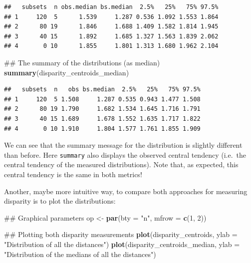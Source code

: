 \documentclass[]{book}
\newenvironment{Shaded}{\begin{snugshade}}{\end{snugshade}}
\newcommand{\KeywordTok}[1]{\textcolor[rgb]{0.13,0.29,0.53}{\textbf{#1}}}
\newcommand{\DataTypeTok}[1]{\textcolor[rgb]{0.13,0.29,0.53}{#1}}
\newcommand{\DecValTok}[1]{\textcolor[rgb]{0.00,0.00,0.81}{#1}}
\newcommand{\StringTok}[1]{\textcolor[rgb]{0.31,0.60,0.02}{#1}}
\newcommand{\NormalTok}[1]{#1}
\theoremstyle{definition}
\theoremstyle{definition}
\theoremstyle{remark}
\begin{document}
\begin{verbatim}
##   subsets  n obs.median bs.median  2.5%   25%   75% 97.5%
## 1     120  5      1.539     1.287 0.536 1.092 1.553 1.864
## 2      80 19      1.846     1.688 1.409 1.582 1.814 1.945
## 3      40 15      1.892     1.685 1.327 1.563 1.839 2.062
## 4       0 10      1.855     1.801 1.313 1.680 1.962 2.104
\end{verbatim}

\begin{Shaded}
\begin{Highlighting}[]
\NormalTok{## The summary of the distributions (as median)}
\KeywordTok{summary}\NormalTok{(disparity_centroids_median)}
\end{Highlighting}
\end{Shaded}

\begin{verbatim}
##   subsets  n   obs bs.median  2.5%   25%   75% 97.5%
## 1     120  5 1.508     1.287 0.535 0.943 1.477 1.508
## 2      80 19 1.790     1.682 1.534 1.645 1.716 1.791
## 3      40 15 1.689     1.678 1.552 1.635 1.717 1.822
## 4       0 10 1.910     1.804 1.577 1.761 1.855 1.909
\end{verbatim}

We can see that the summary message for the distribution is slightly
different than before. Here \texttt{summary} also displays the observed
central tendency (i.e.~the central tendency of the measured
distributions). Note that, as expected, this central tendency is the
same in both metrics!

Another, maybe more intuitive way, to compare both approaches for
measuring disparity is to plot the distributions:

\begin{Shaded}
\begin{Highlighting}[]
\NormalTok{## Graphical parameters}
\NormalTok{op <-}\StringTok{ }\KeywordTok{par}\NormalTok{(}\DataTypeTok{bty =} \StringTok{"n"}\NormalTok{, }\DataTypeTok{mfrow =} \KeywordTok{c}\NormalTok{(}\DecValTok{1}\NormalTok{, }\DecValTok{2}\NormalTok{))}

\NormalTok{## Plotting both disparity measurements}
\KeywordTok{plot}\NormalTok{(disparity_centroids, }\DataTypeTok{ylab =} \StringTok{"Distribution of all the distances"}\NormalTok{)}
\KeywordTok{plot}\NormalTok{(disparity_centroids_median,}
     \DataTypeTok{ylab =} \StringTok{"Distribution of the medians of all the distances"}\NormalTok{)}
\end{Highlighting}
\end{Shaded}
\end{document}
